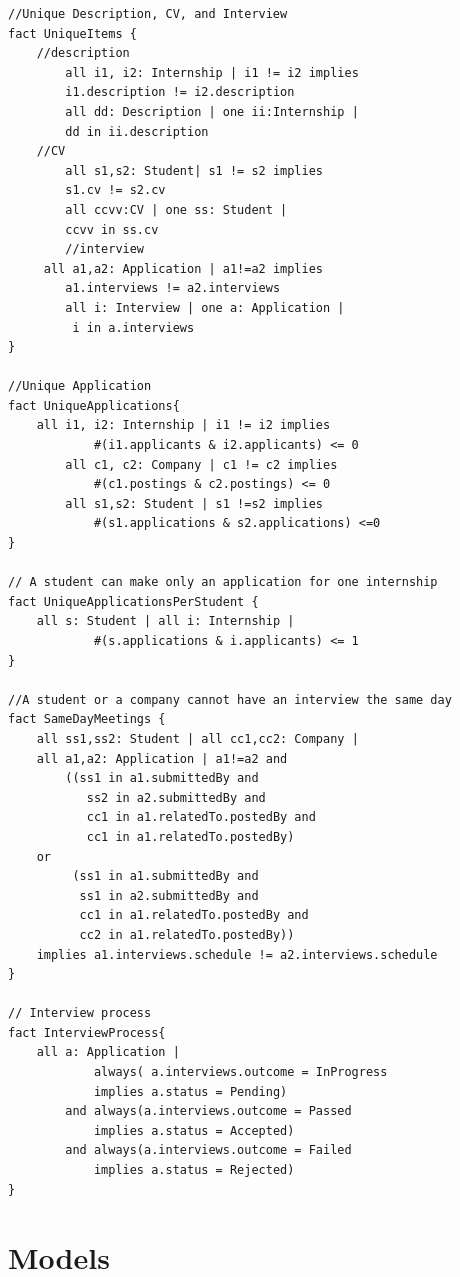 \begin{lstlisting}
//Unique Description, CV, and Interview 
fact UniqueItems {
	//description
    	all i1, i2: Internship | i1 != i2 implies
   		i1.description != i2.description
    	all dd: Description | one ii:Internship | 
		dd in ii.description
	//CV
    	all s1,s2: Student| s1 != s2 implies
		s1.cv != s2.cv
    	all ccvv:CV | one ss: Student |  
		ccvv in ss.cv
    	//interview
   	 all a1,a2: Application | a1!=a2 implies 
   		a1.interviews != a2.interviews
    	all i: Interview | one a: Application |
		 i in a.interviews
}

//Unique Application
fact UniqueApplications{
	all i1, i2: Internship | i1 != i2 implies 
    		#(i1.applicants & i2.applicants) <= 0
    	all c1, c2: Company | c1 != c2 implies 
    		#(c1.postings & c2.postings) <= 0
    	all s1,s2: Student | s1 !=s2 implies 
    		#(s1.applications & s2.applications) <=0
}

// A student can make only an application for one internship
fact UniqueApplicationsPerStudent {
	all s: Student | all i: Internship | 
    		#(s.applications & i.applicants) <= 1
}

//A student or a company cannot have an interview the same day
fact SameDayMeetings {
	all ss1,ss2: Student | all cc1,cc2: Company |
   	all a1,a2: Application | a1!=a2 and
   		((ss1 in a1.submittedBy and 
		   ss2 in a2.submittedBy and
   		   cc1 in a1.relatedTo.postedBy and
		   cc1 in a1.relatedTo.postedBy)
   	or
   		 (ss1 in a1.submittedBy and 
		  ss1 in a2.submittedBy and
   		  cc1 in a1.relatedTo.postedBy and 
		  cc2 in a1.relatedTo.postedBy))
   	implies a1.interviews.schedule != a2.interviews.schedule
}

// Interview process
fact InterviewProcess{ 
	all a: Application | 
        	always( a.interviews.outcome = InProgress 
			implies a.status = Pending)
	 	and always(a.interviews.outcome = Passed 
			implies a.status = Accepted)
		and always(a.interviews.outcome = Failed 
			implies a.status = Rejected)
}

\end{lstlisting}


\pagebreak
\section{ Models}
